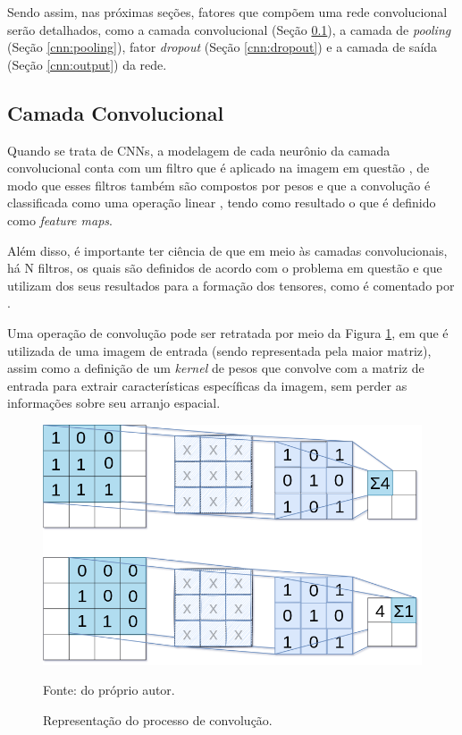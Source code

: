Sendo assim, nas próximas seções, fatores que compõem uma rede convolucional serão detalhados, como a camada convolucional (Seção \ref{cnn:conv}), a camada de \textit{pooling} (Seção \ref{cnn:pooling}), fator \textit{dropout} (Seção \ref{cnn:dropout}) e a camada de saída (Seção \ref{cnn:output}) da rede.


\subsection{Camada Convolucional}
\label{cnn:conv}

Quando se trata de CNNs, a modelagem de cada neurônio da camada convolucional conta com um filtro que é aplicado na imagem em questão \cite{ponti2018funciona}, de modo que esses filtros também são compostos por pesos e que a convolução é classificada como uma operação linear \cite{Goodfellow2016}, tendo como resultado o que é definido como \textit{feature maps}.

Além disso, é importante ter ciência de que em meio às camadas convolucionais, há N filtros, os quais são definidos de acordo com o problema em questão e que utilizam dos seus resultados para a formação dos tensores, como é comentado por \cite{ponti2018funciona}.

Uma operação de convolução pode ser retratada por meio da Figura \ref{cnn:fig:6}, em que é  utilizada de uma imagem de entrada (sendo representada pela maior matriz), assim como a definição de um \textit{kernel} de pesos que convolve com a matriz de entrada para extrair características específicas da imagem, sem perder as informações sobre seu arranjo espacial.

\begin{figure}[H]
    \centering
    \caption{Representação do processo de convolução.}
    \includegraphics[width=1\linewidth]{recursos/imagens/deep/2d_convolution.png}
    \label{cnn:fig:6}

    Fonte: do próprio autor.
\end{figure}

